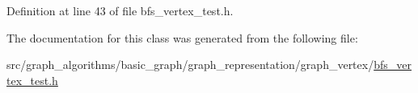 Definition at line 43 of file bfs\+\_\+vertex\+\_\+test.\+h.



The documentation for this class was generated from the following file\+:\begin{DoxyCompactItemize}
\item 
src/graph\+\_\+algorithms/basic\+\_\+graph/graph\+\_\+representation/graph\+\_\+vertex/\hyperlink{bfs__vertex__test_8h}{bfs\+\_\+vertex\+\_\+test.\+h}\end{DoxyCompactItemize}
